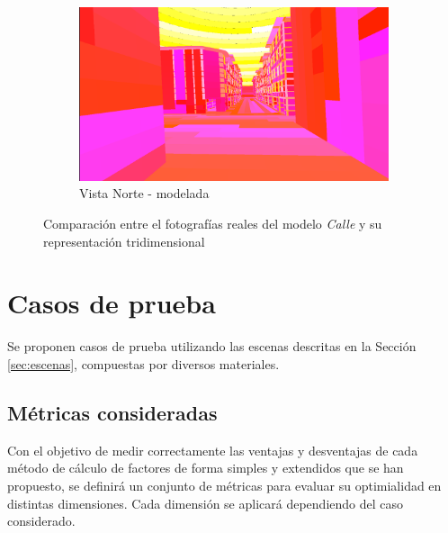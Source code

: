 \begin{figure}[H]
	\begin{subfigure}{0.475\textwidth}
		\includegraphics[width=1\linewidth]{assets/streetmodel2}
		\caption{Vista Norte - modelada}
	\end{subfigure}
	\caption{Comparación entre el fotografías reales del modelo \textit{Calle} y su representación tridimensional}
	\label{img:streetcomp}
\end{figure}

\section{Casos de prueba}
\label{sec:pruebas}

Se proponen casos de prueba utilizando las escenas descritas en la Sección \ref{sec:escenas}, compuestas por diversos materiales.

\subsection{Métricas consideradas}
\label{metricasestablecidas}
Con el objetivo de medir correctamente las ventajas y desventajas de cada método de cálculo de factores de forma simples y extendidos que se han propuesto, se definirá un conjunto de métricas para evaluar su optimialidad en distintas dimensiones. Cada dimensión se aplicará dependiendo del caso considerado.

